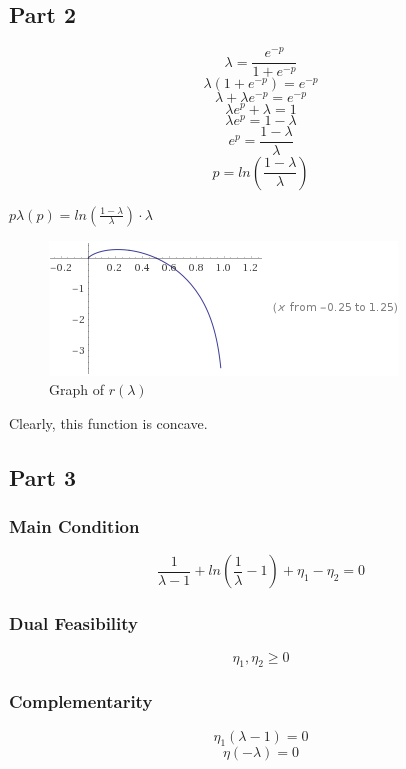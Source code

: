 \documentclass{article}
\begin{document}
\subsection{Part 2}

$$\lambda = \frac{e^{-p}}{1 + e^{-p}}$$
$$\lambda (1 + e^{-p}) = e^{-p}$$
$$\lambda + \lambda e^{-p} = e^{-p}$$
$$\lambda e^p + \lambda = 1$$
$$\lambda e^p = 1 - \lambda$$
$$e^p = \frac{1 - \lambda}{\lambda}$$
$$p = ln(\frac{1 - \lambda}{\lambda})$$

$p \lambda(p) = ln(\frac{1 - \lambda}{\lambda}) \cdot \lambda$\\

\begin{figure}[H] %
  \centering
  \includegraphics[angle=0,totalheight=50mm]{P33.png}
  \caption{Graph of $r(\lambda)$}
  \label{fig:tabl}
\end{figure}

Clearly, this function is concave. 

\subsection{Part 3}

\subsubsection{Main Condition}

$$\frac{1}{\lambda - 1} + ln(\frac{1}{\lambda} - 1) + \eta_1 - \eta _2 = 0$$

\subsubsection{Dual Feasibility}

$$\eta_1, \eta_2 \ge 0$$

\subsubsection{Complementarity}

$$\eta_1(\lambda - 1) = 0$$
$$\eta(-\lambda) = 0$$
\end{document}
